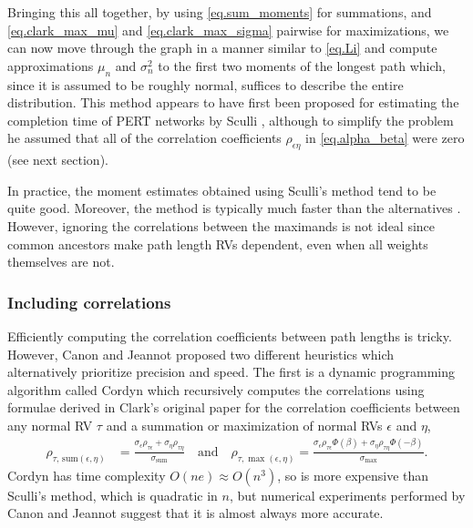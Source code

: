 \documentclass[12pt]{article}
\begin{document}
Bringing this all together, by using \eqref{eq.sum_moments} for summations, and \eqref{eq.clark_max_mu} and \eqref{eq.clark_max_sigma} pairwise for maximizations, we can now move through the graph in a manner similar to \eqref{eq.Li} and compute approximations $\mu_n$ and $\sigma_n^2$ to the first two moments of the longest path which, since it is assumed to be roughly normal, suffices to describe the entire distribution. This method appears to have first been proposed for estimating the completion time of PERT networks by Sculli \cite{scu83}, although to simplify the problem he assumed that all of the correlation coefficients $\rho_{\epsilon \eta}$ in \eqref{eq.alpha_beta} were zero (see next section).

In practice, the moment estimates obtained using Sculli's method tend to be quite good. Moreover, the method is typically much faster than the alternatives \cite{can16}. However, ignoring the correlations between the maximands is not ideal since common ancestors make path length RVs dependent, even when all weights themselves are not. 

\subsubsection{Including correlations}
\label{subsubsect.correlation_aware}

Efficiently computing the correlation coefficients between path lengths is tricky. However, Canon and Jeannot \cite{can16} proposed two different heuristics which alternatively prioritize precision and speed. The first is a dynamic programming algorithm called Cordyn which recursively computes the correlations using formulae derived in Clark's original paper for the correlation coefficients between any normal RV $\tau$ and a summation or maximization of normal RVs $\epsilon$ and $\eta$, 
\begin{align}
  \label{eq.clark_corrs}
  \rho_{\tau, \, \text{sum}(\epsilon, \eta)} &= \frac{\sigma_\epsilon \rho_{\tau \epsilon} + \sigma_\eta \rho_{\tau \eta} }{\sigma_{\text{sum}}} \quad \text{and} \quad
\rho_{\tau, \max(\epsilon, \eta)} = \frac{\sigma_\epsilon \rho_{\tau \epsilon} \Phi(\beta) + \sigma_\eta \rho_{\tau \eta} \Phi(-\beta)}{\sigma_{\max}}.
\end{align} 
Cordyn has time complexity $O(ne) \approx O(n^3)$, so is more expensive than Sculli's method, which is quadratic in $n$, but numerical experiments performed by Canon and Jeannot suggest that it is almost always more accurate. 
\end{document}
